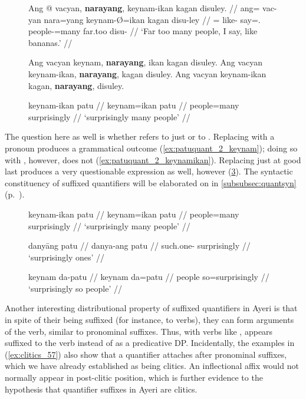\begin{figure}
\pex\label{ex:clitics_56}
\a\label{ex:clitics_56a}\begingl
	\gla Ang @ vacyan, \textbf{narayang}, keynam-ikan kagan disuley. //
	\glb ang= vac-yan nara=yang keynam-Ø=ikan kagan disu-ley //
	\glc \AgtT{}= like-\TplM{} say=\Fsg{}.\Aarg{} people-\Top{}=many far.too
		disu-\PargI{} //
	\glft `Far too many people, I say, like bananas.' //
\endgl

\a\label{ex:clitics_56b}
	\ljudge{*} Ang vacyan keynam, \textbf{narayang}, ikan kagan disuley.
\a\label{ex:clitics_56c}
	\ljudge{*} Ang vacyan keynam-ikan, \textbf{narayang}, kagan disuley.
\a\label{ex:clitics_56d}
	Ang vacyan keynam-ikan kagan, \textbf{narayang}, disuley.
\xe
\end{figure}

\begin{figure}
\ex\label{ex:patuquant_1}\begingl
	\gla keynam-ikan patu //
	\glb keynam=ikan patu //
	\glc people=many surprisingly //
	\glft `surprisingly many people' //
\endgl\xe
\end{figure}

The question here as well is whether  refers to just 
 or to . Replacing
 with a pronoun produces a grammatical outcome
(\ref{ex:patuquant_2_keynam}); doing so with ,
however, does not (\ref{ex:patuquant_2_keynamikan}). Replacing just
 at good last produces a very questionable expression as
well, however (\ref{ex:patuquant_2_ikan}). The syntactic constituency of
suffixed quantifiers will be elaborated on in \autoref{subsubsec:quantsyn}
(p.~\pageref{subsubsec:quantsyn}).

\begin{figure}
\pex\label{ex:patuquant_2}
\a\label{ex:patuquant_2_keynam}\begingl
	\gla keynam-ikan patu //
	\glb keynam=ikan patu //
	\glc people=many surprisingly //
	\glft `surprisingly many people' //
\endgl

\a\label{ex:patuquant_2_keynamikan}\ljudge*\begingl
	\gla danyāng patu //
	\glb danya-ang patu //
	\glc such.one-\Aarg{} surprisingly //
	\glft `surprisingly ones' //
\endgl

\a\label{ex:patuquant_2_ikan}\ljudge\ques\begingl
	\gla keynam da-patu //
	\glb keynam da=patu //
	\glc people so=surprisingly //
	\glft `surprisingly so people' //
\endgl
\xe
\end{figure}

Another interesting distributional property of suffixed quantifiers in Ayeri is
that in spite of their being suffixed (for instance, to verbs), they can form
arguments of the verb, similar to pronominal suffixes. Thus, with verbs like
,  appears suffixed to the verb
instead of as a predicative DP. Incidentally, the examples in
(\ref{ex:clitics_57}) also show that a quantifier attaches after pronominal
suffixes, which we have already established as being clitics. An inflectional
affix would not normally appear in post-clitic position, which is further
evidence to the hypothesis that quantifier suffixes in Ayeri are clitics.

